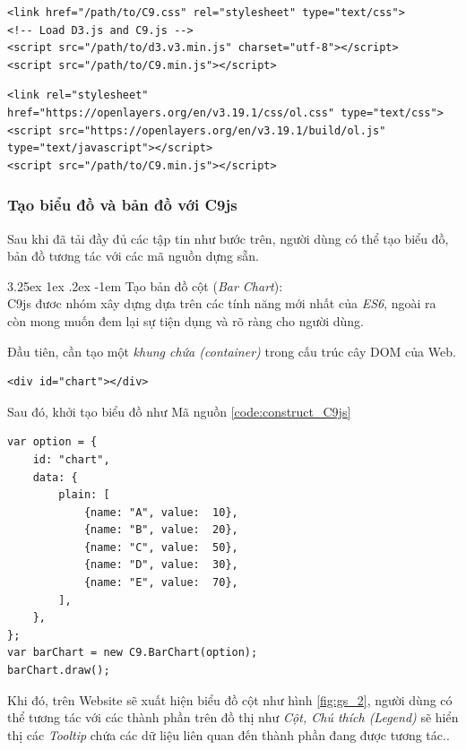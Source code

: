 \documentclass[12pt,a4paper,twoside]{article}
\makeatletter
\newcommand{\myparagraph}[1]{\paragraph{#1}\mbox{}\\} %
\renewcommand\paragraph{\@startsection{paragraph}{5}{\z@}%
  {3.25ex \@plus1ex \@minus.2ex}%
  {-1em}%
  {\normalfont\normalsize\bfseries}}
\makeatother
\begin{document}
\begin{lstlisting}[caption=Tải mã nguồn \textit{D3.js} trước tiên]
<link href="/path/to/C9.css" rel="stylesheet" type="text/css">
<!-- Load D3.js and C9.js -->
<script src="/path/to/d3.v3.min.js" charset="utf-8"></script>
<script src="/path/to/C9.min.js"></script>
\end{lstlisting}

\begin{lstlisting}[caption=Tải mã nguồn \textit{OpenLayers 3} nếu muốn sử dụng chức năng Bản đồ]
<link rel="stylesheet" href="https://openlayers.org/en/v3.19.1/css/ol.css" type="text/css">
<script src="https://openlayers.org/en/v3.19.1/build/ol.js" type="text/javascript"></script>
<script src="/path/to/C9.min.js"></script>
\end{lstlisting}

\subsubsection{Tạo biểu đồ và bản đồ với C9js}
Sau khi đã tải đầy đủ các tập tin như bước trên, người dùng có thể tạo biểu đồ, bản đồ tương tác với các mã nguồn dựng sẵn.

\myparagraph{Tạo bản đồ cột (\textit{Bar Chart}):}
C9js đươc nhóm xây dựng dựa trên các tính năng mới nhất của \textit{ES6}, ngoài ra còn mong muốn đem lại sự tiện dụng và rõ ràng cho người dùng.

Đầu tiên, cần tạo một \textit{khung chứa (container)} trong cấu trúc cây DOM của Web.

\begin{lstlisting}[caption=Tạo \textit{container} để chứa biểu đồ]
<div id="chart"></div>
\end{lstlisting}

Sau đó, khởi tạo biểu đồ như Mã nguồn \ref{code:construct_C9js}

\begin{lstlisting}[caption=Khởi tạo biểu đồ với C9js,label={code:construct_C9js}]
var option = {
    id: "chart",
    data: {
        plain: [
            {name: "A", value:  10},
            {name: "B", value:  20},
            {name: "C", value:  50},
            {name: "D", value:  30},
            {name: "E", value:  70},
        ],
    }, 
};
var barChart = new C9.BarChart(option);
barChart.draw();
\end{lstlisting}

Khi đó, trên Website sẽ xuất hiện biểu đồ cột như hình \ref{fig:gs_2}, người dùng có thể tương tác với các thành phần trên đồ thị như \textit{Cột, Chú thích (Legend)} sẽ hiển thị các \textit{Tooltip} chứa các dữ liệu liên quan đến thành phần đang được tương tác..
\end{document}
